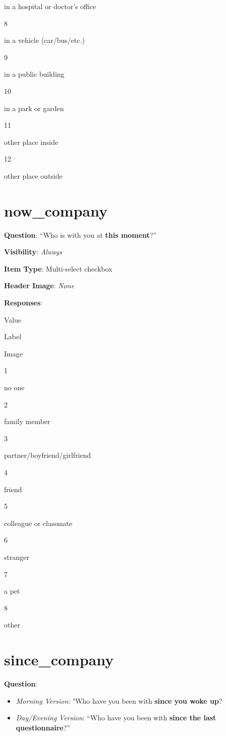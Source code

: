 \documentclass[]{book}
\providecommand{\tightlist}{%
  \setlength{\itemsep}{0pt}\setlength{\parskip}{0pt}}
\begin{document}
in a hospital or doctor's office

8

in a vehicle (car/bus/etc.)

9

in a public building

10

in a park or garden

11

other place inside

12

other place outside

\hypertarget{now_company}{%
\section{now\_company}\label{now_company}}

\textbf{Question}: ``Who is with you at \textbf{this moment}?''

\textbf{Visibility}: \emph{Always}

\textbf{Item Type}: Multi-select checkbox

\textbf{Header Image}: \emph{None}

\textbf{Responses}:

Value

Label

Image

1

no one

2

family member

3

partner/boyfriend/girlfriend

4

friend

5

colleague or classmate

6

stranger

7

a pet

8

other

\hypertarget{since_company}{%
\section{since\_company}\label{since_company}}

\textbf{Question}:

\begin{itemize}
\tightlist
\item
  \emph{Morning Version}: "Who have you been with \textbf{since you woke up}?
\item
  \emph{Day/Evening Version}: ``Who have you been with \textbf{since the last questionnaire}?''
\end{itemize}
\end{document}
